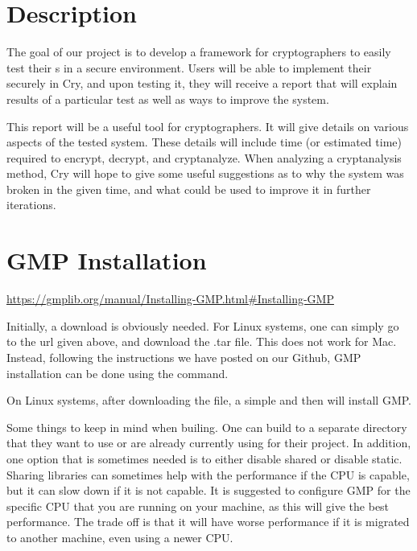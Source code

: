 \section{\cry{} Description}



The goal of our project is to develop a framework for
cryptographers to easily test their \cs s in a
secure environment. Users will be able to implement their
\cs{} securely in Cry, and upon testing it, they will
receive a report that will explain results of a particular
test as well as ways to improve the system.

\medskip

This report will be a useful tool for cryptographers. It
will give details on various aspects of the tested system.
These details will include time (or estimated time) required
to encrypt, decrypt, and cryptanalyze. When analyzing a
cryptanalysis method, Cry will hope to give some useful
suggestions as to why the system was broken in the given
time, and what could be used to improve it in further
iterations.


\section{GMP Installation}

\url{https://gmplib.org/manual/Installing-GMP.html#Installing-GMP}

Initially, a download is obviously needed. For Linux systems, one can simply go to the url
given above, and download the .tar file. This does not work for Mac. Instead, following the
instructions we have posted on our Github, GMP installation can be done using the 
command.

On Linux systems, after downloading the file, a simple  and then 
will install GMP.

Some things to keep in mind when builing. One can build to a separate directory that they want to use or
are already currently using for their project. In addition, one option that is sometimes needed is to either
disable shared or disable static. Sharing libraries can sometimes help with the performance if the CPU is
capable, but it can slow down if it is not capable. It is suggested to configure GMP for the specific CPU that
you are running on your machine, as this will give the best performance. The trade off is that it will have worse performance
if it is migrated to another machine, even using a newer CPU.

